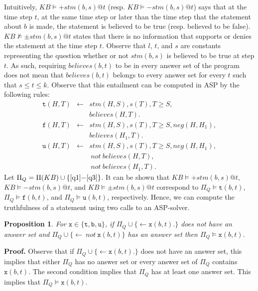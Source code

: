 \documentclass{article}
\newtheorem{proposition}[theorem]{Proposition}
\def\naf{\: {not} \:}
\begin{document}
Intuitively, $KB  \models {+}stm(b,s)@t$ (resp. $KB  \models {-}stm(b,s)@t$) says that at the time step $t$, at the same time step or later than the time step that the statement about $b$ is made, the statement is believed to be true (resp. believed to be false). $KB \not\models {\pm}stm(b,s)@t$ states that there is no information that supports or denies the statement at the time step $t$. Observe that $l$, $t$, and $s$ are constants representing the question whether or not $stm(b,s)$ is believed to be true at step $t$. As such, requiring $believes(b,t)$ to be in every answer set of the program 
does not mean that $believes(b,t)$ belongs to every answer set for every $t$ such that $s \le t \le k$. 
Observe that this entailment can be computed in ASP by the following rules: 
%
{
\begin{eqnarray}
\mathtt{t}(H, T) & \leftarrow & stm(H, S), s(T), T \ge S, \nonumber \\
        &  & believes(H, T). \label{q1} \\ 
\mathtt{f}(H, T) & \leftarrow & stm(H, S), s(T), T \ge S, neg(H,H_1),  \nonumber\\ 
& & believes(H_1, T).  \label{q2}\\
\mathtt{u}(H, T) & \leftarrow & stm(H, S), s(T), T \ge S, neg(H,H_1), \nonumber  \\
& & \naf believes(H, T), \nonumber \\
&&  \naf believes(H_1, T). \label{q3}
\end{eqnarray}
}
%
Let $\Pi_Q = \Pi(KB) \cup \{\eqref{q1}{-}\eqref{q3}\}$. It can be shown that 
 $KB  \models {+}stm(b,s)@t$, $KB  \models {-}stm(b,s)@t$, and  $KB  \models {\pm}stm(b,s)@t$ 
 correspond to $\Pi_Q \models \mathtt{t}(b,t)$, $\Pi_Q \models \mathtt{f}(b,t)$, and 
 $\Pi_Q \models \mathtt{u}(b,t)$, respectively. Hence, we can compute the truthfulness of a statement 
using two calls to an ASP-solver. 
 

\begin{proposition} 
For $\mathtt{x} \in \{\mathtt{t, b, u}\}$,
if  $\Pi_Q \cup \{\leftarrow  \mathtt{x}(b,t).\}$ does not have an answer set and  
$\Pi_Q \cup \{\leftarrow \naf \mathtt{x}(b,t)\}$   has an answer set then   $\Pi_Q \models \mathtt{x}(b, t)$. 
\end{proposition}  
% 
\noindent
{\bf Proof.}
Observe that if $\Pi_Q \cup \{\leftarrow \mathtt{x}(b,t).\}$ does not have an answer set, this
implies that  either $\Pi_Q$ has no answer set or every answer set of $\Pi_Q$
contains $\mathtt{x}(b,t)$. The second condition implies that $\Pi_Q$ has at least one answer set. 
This implies that  $\Pi_Q \models \mathtt{x}(b, t)$.  
\hfill\qedsymbol{}
\end{document}
